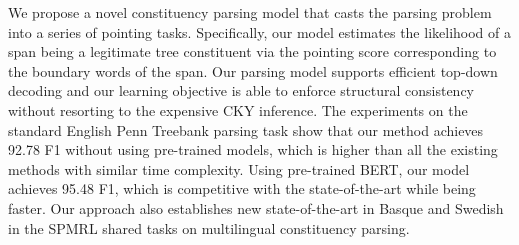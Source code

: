 We propose a novel constituency parsing model that casts the parsing problem into a series of pointing tasks. Specifically, our model estimates the likelihood of a span being a legitimate tree constituent via the pointing score corresponding to the boundary words of the span. Our parsing model supports efficient top-down decoding and our learning objective is able to enforce structural consistency without resorting to the expensive CKY inference. The experiments on the standard English Penn Treebank parsing task show that our method achieves 92.78 F1 without using pre-trained models, which is higher than all the existing methods with similar time complexity. Using pre-trained BERT, our model achieves 95.48 F1, which is competitive with the state-of-the-art while being faster. Our approach also establishes new state-of-the-art in Basque and Swedish in the SPMRL shared tasks on multilingual constituency parsing.
